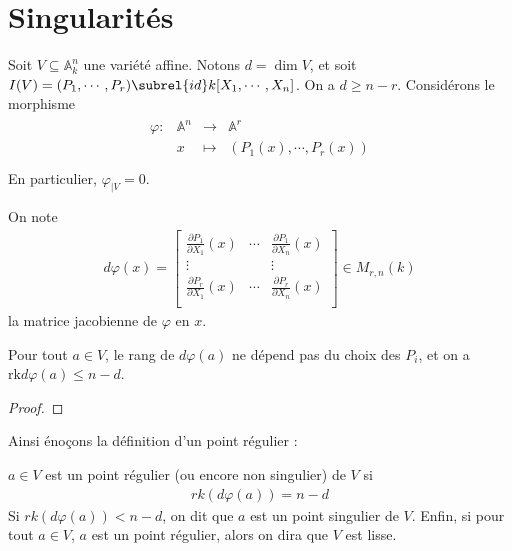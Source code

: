     \section{Singularités}
        Soit $V \subseteq \mathbb{A}^n_k$ une variété affine. Notons $d = \dim V$, et soit $I(V) = (P_1, \cdots, P_r) \subrel{id} k[X_1, \cdots, X_n]$. On a $d \geq n - r$. Considérons le morphisme
        \begin{align*}
            \begin{array}{cccc}
                \varphi : & \mathbb{A}^n & \to & \mathbb{A}^r \\
                & x & \mapsto & (P_1(x), \cdots, P_r(x)) \\
            \end{array}
        \end{align*}
        En particulier, $\varphi_{|V} = 0$.
        \begin{nota}
            On note
            \begin{align*}
                d \varphi (x) = 
                \begin{bmatrix}
                    \frac{\partial P_1}{\partial X_1}(x) & \cdots & \frac{\partial P_1}{\partial X_n}(x) \\
                    \vdots & & \vdots \\
                    \frac{\partial P_r}{\partial X_1}(x) & \cdots & \frac{\partial P_r}{\partial X_n}(x) \\
                \end{bmatrix}
                \in M_{r, n}(k)
            \end{align*}
            la matrice jacobienne de $\varphi$ en $x$.
        \end{nota}
        \begin{prop}
            Pour tout $a \in V$, le rang de $d\varphi(a)$ ne dépend pas du choix des $P_i$, et on a $\mathrm{rk} d\varphi(a) \leq n - d$.
        \end{prop}
        \begin{proof}
        \end{proof}
        Ainsi énoçons la définition d'un point régulier :
        \begin{defi}
            $a \in V$ est un point régulier (ou encore non singulier) de $V$ si 
            \begin{align*}
                rk (d \varphi(a)) = n - d
            \end{align*}
            Si $rk (d \varphi(a)) < n - d$, on dit que $a$ est un point singulier de $V$. Enfin, si pour tout $a \in V$, $a$ est un point régulier, alors on dira que $V$ est lisse.
        \end{defi}
